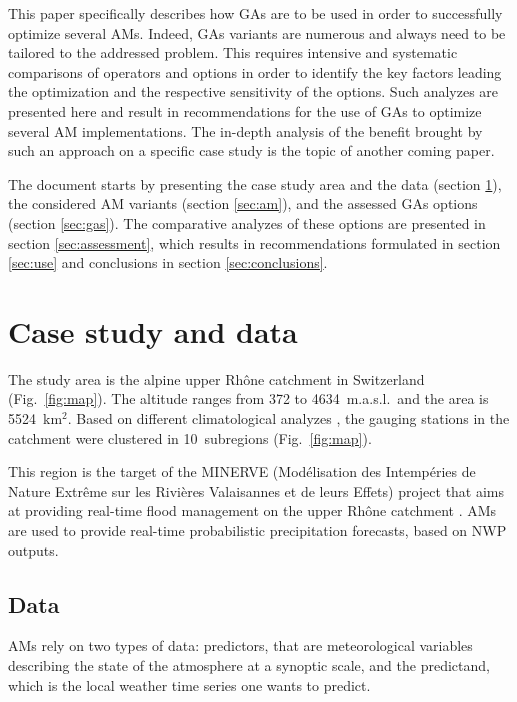 \documentclass{ametsoc}
\begin{document}
This paper specifically describes how GAs are to be used in order to successfully optimize several AMs. Indeed, GAs variants are numerous and always need to be tailored to the addressed problem. This requires intensive and systematic comparisons of operators and options in order to identify the key factors leading the optimization and the respective sensitivity of the options. Such analyzes are presented here and result in recommendations for the use of GAs to optimize several AM implementations. The in-depth analysis of the benefit brought by such an approach on a specific case study is the topic of another coming paper. 

The document starts by presenting the case study area and the data (section \ref{sec:case_study_data}), the considered AM variants (section \ref{sec:am}), and the assessed GAs options (section \ref{sec:gas}). The comparative analyzes of these options are presented in section \ref{sec:assessment}, which results in recommendations formulated in section \ref{sec:use} and conclusions in section \ref{sec:conclusions}.


\section{Case study and data}
\label{sec:case_study_data}

The study area is the alpine upper Rh\^{o}ne catchment in Switzerland (Fig.\ \ref{fig:map}). The altitude ranges from 372 to 4634~m.a.s.l.\ and the area is 5524~km$^{2}$.  Based on different climatological analyzes \cite[see][for the details]{Horton2012a}, the gauging stations in the catchment were clustered in 10~subregions (Fig.\ \ref{fig:map}).

This region is the target of the MINERVE (Mod\'{e}lisation des Intemp\'{e}ries de Nature Extr\^{e}me sur les Rivi\`{e}res Valaisannes et de leurs Effets) project that aims at providing real-time flood management on the upper Rh\^{o}ne catchment \citep{GarciaHernandez2009b}. AMs are used to provide real-time probabilistic precipitation forecasts, based on NWP outputs. 


\subsection{Data}
\label{sec:data}

AMs rely on two types of data: predictors, that are meteorological variables describing the state of the atmosphere at a synoptic scale, and the predictand, which is the local weather time series one wants to predict.
\end{document}
